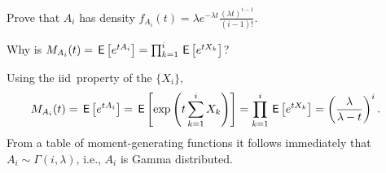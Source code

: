 \documentclass[stochastic-or.tex]{subfiles}
\begin{document}
\begin{exercise}\label{ex:54}
 Prove that $A_i$ has density %
$f_{A_i}(t) = \lambda e^{-\lambda t} \frac{(\lambda t)^{i-1}}{(i-1)!}$.
\begin{hint}
Why is $M_{A_i}(t) = \,\mathsf{E}\left[e^{t A_i}\right] = \prod_{k=1}^{i} \,\mathsf{E}\left[e^{tX_k}\right]$?
\end{hint}
\begin{solution}
 Using the iid\ property of the $\{X_i\}$,
\begin{align*}
 M_{A_i}(t) &= \,\mathsf{E}\left[e^{t A_i}\right] = \,\mathsf{E}\left[\exp\left(t\sum_{k=1}^{i} X_k\right)\right]  = \prod_{k=1}^{i} \,\mathsf{E}\left[e^{tX_k}\right] =
  \left(\frac{\lambda}{\lambda -t }\right)^i.
\end{align*}
From a table of moment-generating functions it follows immediately that
$A_i \sim \Gamma(i,\lambda)$, i.e., $A_i$ is Gamma distributed.
\end{solution}
\end{exercise}

\end{document}
